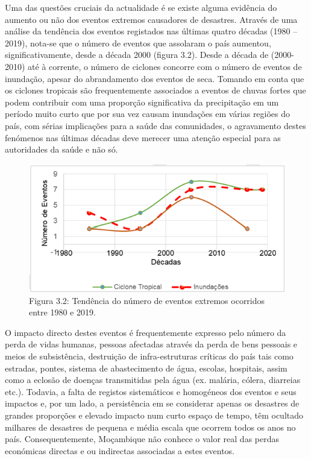 \documentclass[
]{book}
\begin{document}
Uma das questões cruciais da actualidade é se existe alguma evidência do aumento ou não dos eventos extremos causadores de desastres. Através de uma análise da tendência dos eventos registados nas últimas quatro décadas (1980 -- 2019), nota-se que o número de eventos que assolaram o país aumentou, significativamente, desde a década 2000 (figura 3.2). Desde a década de (2000-2010) até à corrente, o número de ciclones concorre com o número de eventos de inundação, apesar do abrandamento dos eventos de seca.
Tomando em conta que os ciclones tropicais são frequentemente associados a eventos de chuvas fortes que podem contribuir com uma proporção significativa da precipitação em um período muito curto que por sua vez causam inundações em várias regiões do país, com sérias implicações para a saúde das comunidades, o agravamento destes fenómenos nas últimas décadas deve merecer uma atenção especial para as autoridades da saúde e não só.

\begin{figure}
\centering
\includegraphics{images/eventos_extremos.png}
\caption{Figura 3.2: Tendência do número de eventos extremos ocorridos entre 1980 e 2019.}
\end{figure}

O impacto directo destes eventos é frequentemente expresso pelo número da perda de vidas humanas, pessoas afectadas através da perda de bens pessoais e meios de subsistência, destruição de infra-estruturas críticas do país tais como estradas, pontes, sistema de abastecimento de água, escolas, hospitais, assim como a eclosão de doenças transmitidas pela água (ex. malária, cólera, diarreias etc.). Todavia, a falta de registos sistemáticos e homogéneos dos eventos e seus impactos e, por um lado, a persistência em se considerar apenas os desastres de grandes proporções e elevado impacto num curto espaço de tempo, têm ocultado milhares de desastres de pequena e média escala que ocorrem todos os anos no país. Consequentemente, Moçambique não conhece o valor real das perdas económicas directas e ou indirectas associadas a estes eventos.
\end{document}
